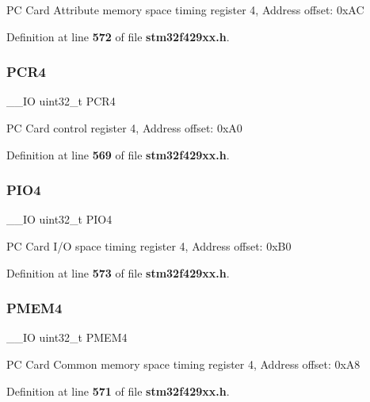PC Card Attribute memory space timing register 4, Address offset\+: 0x\+AC 

Definition at line \textbf{ 572} of file \textbf{ stm32f429xx.\+h}.

\mbox{\label{structFMC__Bank4__TypeDef_a2f02e7acfbd7e549ede84633215eb6a1}} 
\subsubsection{P\+C\+R4}
{\footnotesize\ttfamily \+\_\+\+\_\+\+IO uint32\+\_\+t P\+C\+R4}

PC Card control register 4, Address offset\+: 0x\+A0 

Definition at line \textbf{ 569} of file \textbf{ stm32f429xx.\+h}.

\mbox{\label{structFMC__Bank4__TypeDef_ac53cd7a08093a4ae8f4de4bcff67a64f}} 
\subsubsection{P\+I\+O4}
{\footnotesize\ttfamily \+\_\+\+\_\+\+IO uint32\+\_\+t P\+I\+O4}

PC Card I/O space timing register 4, Address offset\+: 0x\+B0 

Definition at line \textbf{ 573} of file \textbf{ stm32f429xx.\+h}.

\mbox{\label{structFMC__Bank4__TypeDef_a3f82cc749845fb0dd7dfa8121d96b663}} 
\subsubsection{P\+M\+E\+M4}
{\footnotesize\ttfamily \+\_\+\+\_\+\+IO uint32\+\_\+t P\+M\+E\+M4}

PC Card Common memory space timing register 4, Address offset\+: 0x\+A8 

Definition at line \textbf{ 571} of file \textbf{ stm32f429xx.\+h}.

